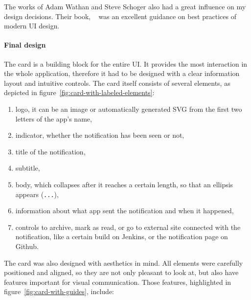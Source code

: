 The works of Adam Wathan and Steve Schoger
also had a great influence
on my design decisions.
Their book,
~\cite{wathan_refactoring_2018}
was an excellent guidance on best practices
of modern \ac{UI} design.

\paragraph*{Final design}\label{sec:final-design}

The card is a building block for the entire \ac{UI}.
It provides the most interaction in the whole application,
therefore it had to be designed with a clear information layout
and intuitive controls.
The card itself consists of several elements,
as depicted in figure~\ref{fig:card-with-labeled-elements}:

\begin{enumerate}
      \item
            logo,
            it can be an image
            or automatically generated \ac{SVG}
            from the first two letters of the app's name,
      \item
            indicator,
            whether the notification has been seen or not,
      \item
            title of the notification,
      \item
            subtitle,
      \item
            body,
            which collapses after it reaches a certain length,
            so that an ellipsis appears (\texttt{...}),
      \item
            information about what app sent the notification and when it happened,
      \item
            controls to archive,
            mark as read,
            or go to external site connected with the notification,
            like a certain build on Jenkins,
            or the notification page on Github.
\end{enumerate}

The card was also designed with aesthetics in mind.
All elements were carefully positioned and aligned,
so they are not only pleasant to look at,
but also have features important for visual communication.
Those features, highlighted in figure~\ref{fig:card-with-guides}, include:

